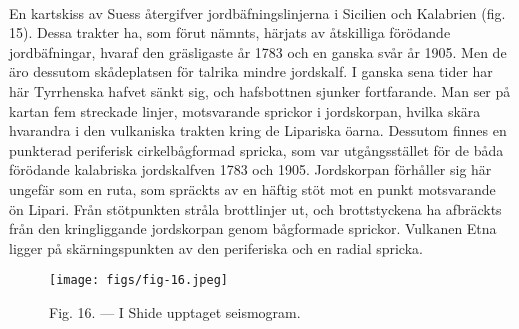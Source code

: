 \documentclass[a4paper, 12pt, oneside, swedish]{article}
\begin{document}
\paragraph{}
En kartskiss av Suess återgifver jordbäfningslinjerna i Sicilien och Kalabrien (fig. 15). Dessa trakter ha, som förut nämnts, härjats av åtskilliga förödande jordbäfningar, hvaraf den gräsligaste år 1783 och en ganska svår år 1905. Men de äro dessutom skådeplatsen för talrika mindre jordskalf. I ganska sena tider har här Tyrrhenska hafvet sänkt sig, och hafsbottnen sjunker fortfarande. Man ser på kartan fem streckade linjer, motsvarande sprickor i jordskorpan, hvilka skära hvarandra i den vulkaniska trakten kring de Lipariska öarna. Dessutom finnes en punkterad periferisk cirkelbågformad spricka, som var utgångsstället för de båda förödande kalabriska jordskalfven 1783 och 1905. Jordskorpan förhåller sig här ungefär som en ruta, som spräckts av en häftig stöt mot en punkt motsvarande ön Lipari. Från stötpunkten stråla brottlinjer ut, och brottstyckena ha afbräckts från den kringliggande jordskorpan genom bågformade sprickor. Vulkanen Etna ligger på skärningspunkten av den periferiska och en radial spricka.

\begin{figure}[H]
\centering
\texttt{[image: figs/fig-16.jpeg]}
\caption{Fig. 16. --- I Shide upptaget seismogram.}
\end{figure}
\end{document}
